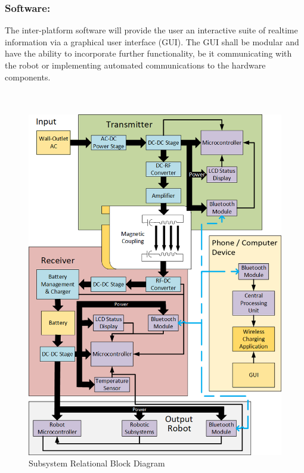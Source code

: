 \documentclass[12pt]{article}
\begin{document}

\subsubsection{Software:}
The inter-platform software will provide the user an interactive suite of realtime information via a graphical user interface (GUI).  The GUI shall be modular and have the ability to incorporate further functionality, be it communicating with the robot or implementing automated communications to the hardware components.\\


\hfill \\
\pagebreak
\hfill \\


\begin{figure}[h!]
\includegraphics[width=0.9\linewidth]{total_diagram}
\caption{Subsystem Relational Block Diagram}
\end{figure}
\end{document}

